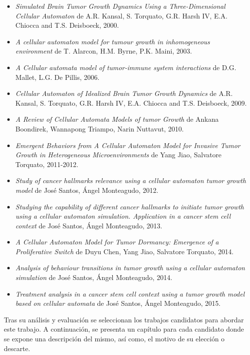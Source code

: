 \begin{itemize}
    \item \textit{Simulated Brain Tumor Growth Dynamics Using a Three-Dimensional Cellular Automaton}
    de A.R. Kansal, S. Torquato, G.R. Harsh IV, E.A. Chiocca and T.S. Deisboeck, 2000.
    \item \textit{A cellular automaton model for tumour growth in inhomogeneous environment}
    de T. Alarcon, H.M. Byrne, P.K. Maini, 2003.
    \item \textit{A Cellular automata model of tumor-immune system interactions}
    de D.G. Mallet, L.G. De Pillis, 2006.
    \item \textit{Cellular Automaton of Idealized Brain Tumor Growth Dynamics}
    de A.R. Kansal, S. Torquato, G.R. Harsh IV, E.A. Chiocca and T.S. Deisboeck, 2009.
    \item \textit{A Review of Cellular Automata Models of tumor Growth}
    de Ankana Boondirek, Wannapong Triampo, Narin Nuttavut, 2010.
    \item \textit{Emergent Behaviors from A Cellular Automaton Model for Invasive Tumor Growth in Heterogeneous Microenvironments}
    de Yang Jiao, Salvatore Torquato, 2011-2012.
    \item \textit{Study of cancer hallmarks relevance using a cellular automaton tumor growth model}
    de José Santos, Ángel Monteagudo, 2012.
    \item \textit{Studying the capability of different cancer hallmarks to initiate tumor growth using a cellular automaton simulation. Application in a cancer stem cell context}
    de José Santos, Ángel Monteagudo, 2013.
    \item \textit{A Cellular Automaton Model for Tumor Dormancy: Emergence of a Proliferative Switch}
    de Duyu Chen, Yang Jiao, Salvatore Torquato, 2014.
    \item \textit{Analysis of behaviour transitions in tumor growth using a cellular automaton simulation}
    de José Santos, Ángel Monteagudo, 2014.
    \item \textit{Treatment analysis in a cancer stem cell context using a tumor growth model based on cellular automata}
    de José Santos, Ángel Monteagudo, 2015.
\end{itemize}

Tras su análisis y evaluación se seleccionan los trabajos candidatos para abordar
este trabajo. A continuación, se presenta un capítulo para cada candidato donde se
expone una descripción del mismo, así como, el motivo de su elección o descarte.

